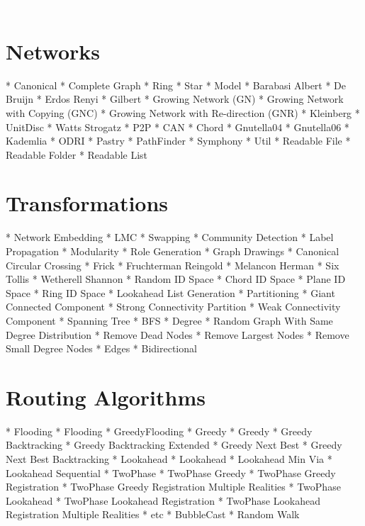 \documentclass[11pt]{amsart}
\title{}
\author{Benjamin Schiller}
\date{}
\begin{document}
\includegraphics{images/GTNA_Logo_RGB.pdf}
\maketitle

\tableofcontents





\section{Networks}

* Canonical
	* Complete Graph
	* Ring
	* Star
* Model
	* Barabasi Albert
	* De Bruijn
	* Erdos Renyi
	* Gilbert
	* Growing Network (GN)
	* Growing Network with Copying (GNC)
	* Growing Network with Re-direction (GNR)
	* Kleinberg
	* UnitDisc
	* Watts Strogatz
* P2P
	* CAN
	* Chord
	* Gnutella04
	* Gnutella06
	* Kademlia
	* ODRI
	* Pastry
	* PathFinder
	* Symphony
* Util
	* Readable File
	* Readable Folder
	* Readable List


\section{Transformations}

* Network Embedding
	* LMC
	* Swapping
* Community Detection
	* Label Propagation
	* Modularity
	* Role Generation
* Graph Drawings
	* Canonical Circular Crossing
	* Frick
	* Fruchterman Reingold
	* Melancon Herman
	* Six Tollis
	* Wetherell Shannon
* Random ID Space
	* Chord ID Space
	* Plane ID Space
	* Ring ID Space
* Lookahead List Generation
* Partitioning
	* Giant Connected Component
	* Strong Connectivity Partition
	* Weak Connectivity Component
* Spanning Tree
	* BFS
* Degree
	* Random Graph With Same Degree Distribution
	* Remove Dead Nodes
	* Remove Largest Nodes
	* Remove Small Degree Nodes
* Edges
	* Bidirectional


\section{Routing Algorithms}

* Flooding
	* Flooding
	* GreedyFlooding
* Greedy
	* Greedy
	* Greedy Backtracking
	* Greedy Backtracking Extended
	* Greedy Next Best
	* Greedy Next Best Backtracking
* Lookahead
	* Lookahead
	* Lookahead Min Via
	* Lookahead Sequential
* TwoPhase
	* TwoPhase Greedy
	* TwoPhase Greedy Registration
	* TwoPhase Greedy Registration Multiple Realities
	* TwoPhase Lookahead
	* TwoPhase Lookahead Registration
	* TwoPhase Lookahead Registration Multiple Realities
* etc
	* BubbleCast
	* Random Walk
\end{document}
